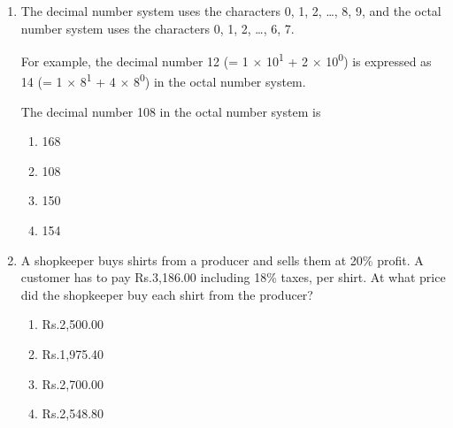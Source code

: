 \documentclass[journal]{IEEEtran}
\numberwithin{equation}{enumi}
\numberwithin{figure}{enumi}
\begin{document}
\begin{enumerate}
\begin{enumerate}
\begin{figure}[!ht]
\label{fig:my_label}
\end{figure}
    \item \begin{figure}[!ht]
\centering
{}%

\label{fig:my_label}
\end{figure}
\end{enumerate}
\item The decimal number system uses the characters 0, 1, 2, \dots, 8, 9, and the octal number system uses the characters 0, 1, 2, \dots, 6, 7.

    For example, the decimal number 12 (= 1 $\times$ 10\textsuperscript{1} + 2 $\times$ 10\textsuperscript{0}) is expressed as 14 (= 1 $\times$ 8\textsuperscript{1} + 4 $\times$ 8\textsuperscript{0}) in the octal number system.

    The decimal number 108 in the octal number system is

    \begin{enumerate}
        \item 168
        \item 108
        \item 150
        \item 154
    \end{enumerate}

    \item A shopkeeper buys shirts from a producer and sells them at 20\% profit. A customer has to pay Rs.3,186.00 including 18\% taxes, per shirt. At what price did the shopkeeper buy each shirt from the producer?

    \begin{enumerate}
        \item Rs.2,500.00
        \item Rs.1,975.40
        \item Rs.2,700.00
        \item Rs.2,548.80
    \end{enumerate}


\end{enumerate}
\end{document}
